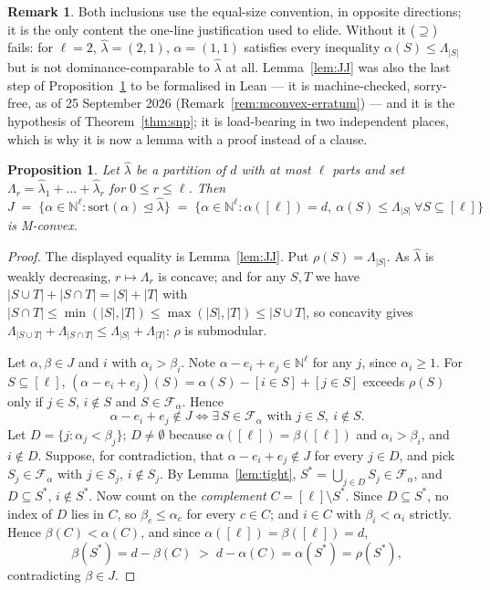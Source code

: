 \documentclass[11pt]{article}
\theoremstyle{plain}
\newtheorem{prop}[thm]{Proposition}
\theoremstyle{definition}
\newcommand{\N}{\mathbb{N}}
\newtheorem*{rem*}{Remark}
\begin{document}
\begin{rem*}
Both inclusions use the equal-size convention, in opposite directions; it is the only content
the one-line justification used to elide. Without it ($\supseteq$) fails: for $\ell=2$,
$\hat\lambda=(2,1)$, $\alpha=(1,1)$ satisfies every inequality $\alpha(S)\le\Lambda_{|S|}$ but
is not dominance-comparable to $\hat\lambda$ at all. Lemma~\ref{lem:JJ} was also the last step of
Proposition~\ref{prop:perm-mconvex} to be formalised in Lean --- it is machine-checked, sorry-free,
as of 25 September 2026 (Remark~\ref{rem:mconvex-erratum}) --- and it is the hypothesis of
Theorem~\ref{thm:snp}; it is load-bearing in two independent places, which is why it is now a
lemma with a proof instead of a clause.
\end{rem*}

\begin{prop}\label{prop:perm-mconvex}
Let $\hat\lambda$ be a partition of $d$ with at most $\ell$ parts and set
$\Lambda_r=\hat\lambda_1+\dots+\hat\lambda_r$ for $0\le r\le\ell$. Then
\[
  J\;=\;\{\alpha\in\N^{\ell}:\mathrm{sort}(\alpha)\trianglelefteq\hat\lambda\}
  \;=\;\{\alpha\in\N^{\ell}:\alpha([\ell])=d,\ \alpha(S)\le\Lambda_{|S|}\ \forall S\subseteq[\ell]\}
\]
is M-convex.
\end{prop}

\begin{proof}
The displayed equality is Lemma~\ref{lem:JJ}. Put $\rho(S)=\Lambda_{|S|}$. As $\hat\lambda$ is weakly decreasing,
$r\mapsto\Lambda_r$ is concave; and for any $S,T$ we have $|S\cup T|+|S\cap T|=|S|+|T|$ with
$|S\cap T|\le\min(|S|,|T|)\le\max(|S|,|T|)\le |S\cup T|$, so concavity gives
$\Lambda_{|S\cup T|}+\Lambda_{|S\cap T|}\le\Lambda_{|S|}+\Lambda_{|T|}$: $\rho$ is submodular.

Let $\alpha,\beta\in J$ and $i$ with $\alpha_i>\beta_i$. Note $\alpha-e_i+e_j\in\N^\ell$ for any
$j$, since $\alpha_i\ge 1$. For $S\subseteq[\ell]$,
$(\alpha-e_i+e_j)(S)=\alpha(S)-[i\in S]+[j\in S]$ exceeds $\rho(S)$ only if $j\in S$, $i\notin
S$ and $S\in\mathcal{F}_\alpha$. Hence
\[
  \alpha-e_i+e_j\notin J\iff \exists\,S\in\mathcal{F}_\alpha \text{ with } j\in S,\ i\notin S.
\]
Let $D=\{j:\alpha_j<\beta_j\}$; $D\neq\emptyset$ because $\alpha([\ell])=\beta([\ell])$ and
$\alpha_i>\beta_i$, and $i\notin D$. Suppose, for contradiction, that
$\alpha-e_i+e_j\notin J$ for every $j\in D$, and pick $S_j\in\mathcal{F}_\alpha$ with $j\in
S_j$, $i\notin S_j$. By Lemma~\ref{lem:tight}, $S^{*}=\bigcup_{j\in D}S_j\in\mathcal{F}_\alpha$,
and $D\subseteq S^{*}$, $i\notin S^{*}$. Now count on the \emph{complement}
$C=[\ell]\setminus S^{*}$. Since $D\subseteq S^{*}$, no index of $D$ lies in $C$, so
$\beta_c\le\alpha_c$ for every $c\in C$; and $i\in C$ with $\beta_i<\alpha_i$ strictly. Hence
$\beta(C)<\alpha(C)$, and since $\alpha([\ell])=\beta([\ell])=d$,
\[
  \beta(S^{*})=d-\beta(C)\;>\;d-\alpha(C)=\alpha(S^{*})=\rho(S^{*}),
\]
contradicting $\beta\in J$.
\end{proof}
\end{document}
